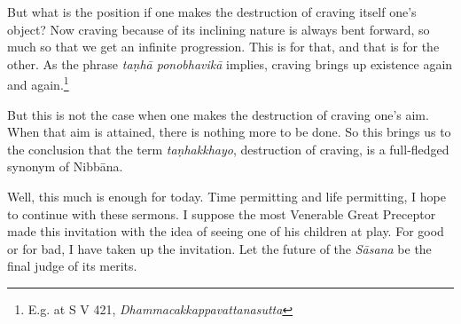 But what is the position if one makes the destruction of craving itself one's object? Now craving because of its inclining nature is always bent forward, so much so that we get an infinite progression. This is for that, and that is for the other. As the phrase \emph{taṇhā ponobhavikā} implies, craving brings up existence again and again.\footnote{E.g. at S V 421, \emph{Dhammacakkappavattanasutta}}

But this is not the case when one makes the destruction of craving one's aim. When that aim is attained, there is nothing more to be done. So this brings us to the conclusion that the term \emph{taṇhakkhayo}, destruction of craving, is a full-fledged synonym of Nibbāna.

Well, this much is enough for today. Time permitting and life permitting, I hope to continue with these sermons. I suppose the most Venerable Great Preceptor made this invitation with the idea of seeing one of his children at play. For good or for bad, I have taken up the invitation. Let the future of the \emph{Sāsana} be the final judge of its merits.

